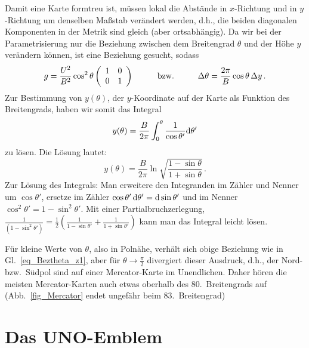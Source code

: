 Damit eine Karte formtreu ist, m\"ussen lokal die Abst\"ande in $x$-Richtung und in $y$-Richtung
um denselben Ma\ss stab ver\"andert werden, d.h., die beiden diagonalen Komponenten in der Metrik
sind gleich (aber ortsabh\"angig). Da wir bei der Parametrisierung nur die Beziehung zwischen dem
Breitengrad $\theta$ und der H\"ohe $y$ ver\"andern k\"onnen, ist eine Beziehung gesucht, sodass
\begin{equation}
     g = \frac{U^2}{B^2} \cos^2 \theta \left( \begin{array}{cc} 1 & 0 \\ 0 & 1 \end{array} \right)  
     \hspace{1cm} {\rm bzw.} \hspace{1cm}    \Delta \theta = \frac{2\pi}{B} \cos \theta\,  \Delta y \, .
\end{equation}
Zur Bestimmung von $y(\theta)$, der $y$-Koordinate auf der Karte als Funktion des Breitengrads,
haben wir somit das Integral
\begin{equation}
                     y(\theta) = \frac{B}{2\pi} \int_{0}^\theta \frac{1}{\cos \theta'} {\rm d}\theta'  
\end{equation}
zu l\"osen. Die L\"osung lautet:
\begin{equation}
                     y(\theta) = \frac{B}{2\pi}  \ln \sqrt{ \frac{1 - \sin \theta}{1+\sin \theta} }\, .
\end{equation}
Zur L\"osung des Integrals: Man erweitere den Integranden im Z\"ahler und Nenner um $\cos \theta'$, ersetze
im Z\"ahler $\cos \theta' \, {\rm d}\theta' = {\rm d} \sin \theta'$ und im Nenner $\cos^2\theta' = 1 - \sin^2 \theta'$.
Mit einer Partialbruchzerlegung, 
$\frac{1}{(1-\sin^2 \theta')} = \frac{1}{2} (\frac{1}{1-\sin \theta'} + \frac{1}{1+\sin \theta'})$
kann man das Integral leicht l\"osen. 

F\"ur kleine Werte von $\theta$, also in Poln\"ahe, verh\"alt sich obige Beziehung wie in Gl.\ \ref{eq_Beztheta_z1},
aber f\"ur $\theta \rightarrow \frac{\pi}{2}$ divergiert dieser Ausdruck, d.h., der Nord- bzw.\ S\"udpol sind auf einer
Mercator-Karte im Unendlichen. Daher h\"oren die meisten Mercator-Karten auch etwas oberhalb des
$80$.\ Breitengrads auf (Abb.\ \ref{fig_Mercator} endet ungef\"ahr beim 83.\ Breitengrad) 

\section{Das UNO-Emblem}


